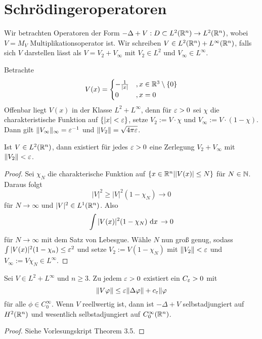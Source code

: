 \documentclass{mycourse}
\begin{document}
\section{Schrödingeroperatoren}

Wir betrachten Operatoren der Form $-\Delta+V:D\subset L^2(\mathbb{R}^n) \to L^2(\mathbb{R}^n)$, wobei $V=M_V$ Multiplikationsoperator ist. Wir schreiben $V\in L^2(\mathbb{R}^n)+L^\infty(\mathbb{R}^n)$, falls sich $V$ darstellen lässt als $V=V_2+V_\infty$ mit $V_2\in L^2$ und $V_\infty \in L^\infty$.

\begin{ex*}[Coloumbpotential]
Betrachte
\[
V(x)=\begin{cases} - \frac{1}{|x|}&, x\in \R^3\setminus\{0\}\\ 0&, x=0 \end{cases}
\]
Offenbar liegt $V(x)$ in der Klasse $L^2+L^\infty$, denn für $\varepsilon>0$ sei $\chi$ die charakteristische Funktion auf $\{|x|<\varepsilon\}$, setze $V_2:= V \cdot \chi$ und $V_\infty:= V\cdot (1-\chi)$. Dann gilt $\|V_\infty\|_\infty=\varepsilon^{-1}$ und $\|V_2\|=\sqrt{4\pi \varepsilon}$.
\end{ex*}

\begin{lem}
Ist $V\in L^2(\mathbb{R}^n)$, dann existiert für jedes $\varepsilon>0$ eine Zerlegung $V_2+V_\infty$ mit $\| V_2\| <\varepsilon$.
\end{lem}
\begin{proof} \fixme
Sei $\chi_N$ die charakterische Funktion auf $\{x\in \mathbb{R}^n| |V(x)|\le N\}$ für $N \in \mathbb{N}$. Daraus folgt
\[
|V|^2 \ge |V|^2(1-\chi_N) \to 0
\]
für $N\to \infty$ und $|V|^2 \in L^1(\mathbb{R}^n)$. Also
\[
\int |V(x)|^2 (1- \chi_N) \, \,\mathrm{d}x\, \to 0
\]
für $N\to \infty$ mit dem Satz von Lebesgue. Wähle $N$ nun groß genug, sodass $\int | V(x)|^2 (1- \chi_n) \le \varepsilon^2$ und setze $V_2:= V(1-\chi_N) $ mit $\| V_2\| < \varepsilon$ und $V_\infty := V\chi_N \in L^\infty$.
\end{proof}
\begin{st}
Sei $V\in L^2+ L^\infty$ und $n\ge 3$. Zu jedem $\varepsilon >0$ existiert ein $C_\varepsilon>0$ mit
\begin{equation}\label{4.2}
\| V\varphi\| \le \varepsilon \| \Delta \varphi\| + c_\varepsilon \| \varphi 
\end{equation}
für alle $\phi \in C_0^\infty$. Wenn $V$ reellwertig ist, dann ist $-\Delta+V$ selbstadjungiert auf $H^2(\mathbb{R}^n)$ und wesentlich selbstadjungiert auf $C_0^\infty(\mathbb{R}^n)$.
\end{st}
\begin{proof}
Siehe Vorlesungskript Theorem 3.5.
\end{proof}
\end{document}
